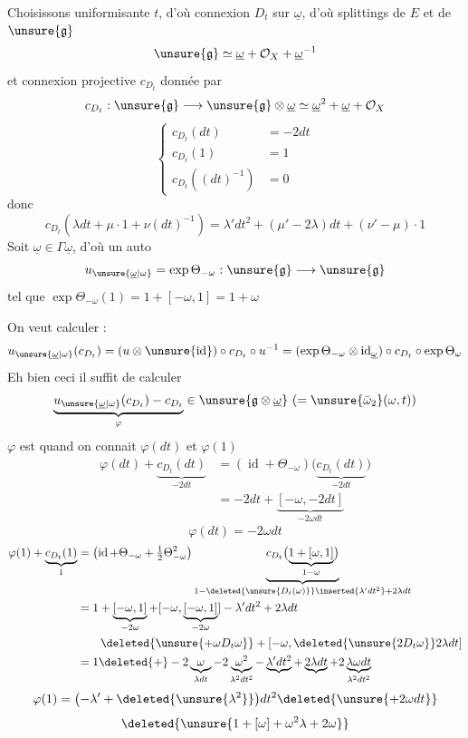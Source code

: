 Choisissons uniformisante $t$, d'où connexion $D_t$ sur $\underline{\omega}$, d'où splittings de $E$ et de $\unsure{\mathfrak g}$
\[
\unsure{\mathfrak g}\simeq\underline{\omega}+\mathcal O_X+\underline{\omega}^{-1}
\]
et connexion projective $c_{D_t}$ donnée par
\[
c_{D_t}:\unsure{\mathfrak g}\longrightarrow\unsure{\mathfrak g}\otimes\underline{\omega}\simeq\underline{\omega}^2+\underline{\omega}+\mathcal O_X
\]
\[
\left\{\begin{aligned}
c_{D_t}(dt)&=-2dt\\
c_{D_t}(1)&=1\\
c_{D_t}((dt)^{-1})&=0
\end{aligned}\right.
\]
donc
\[
c_{D_t}(\lambda dt+\mu\cdot1+\nu(dt)^{-1})=\lambda'dt^2+(\mu'-2\lambda)dt+(\nu'-\mu)\cdot1
\]
Soit $\underline{\omega}\in\Gamma\underline{\omega}$, d'où un auto
\[
u_{\unsure{\underline{\omega}|\omega}}=\exp\Theta_{-\omega}:\unsure{\mathfrak g}\longrightarrow\unsure{\mathfrak g}
\]
tel que $\exp\Theta_{-\omega}(1)=1+[-\omega,1]=1+\omega$

On veut calculer :
\[
u_{\unsure{\underline{\omega}|\omega}}(c_{D_t})=(u\otimes\unsure{\operatorname{id}})\circ c_{D_t}\circ u^{-1}=(\exp\Theta_{-\omega}\otimes\operatorname{id}_{\underline{\omega}})\circ c_{D_t}\circ\exp\Theta_\omega
\]
Eh bien ceci il suffit de calculer
\[
\underbrace{u_{\unsure{\underline{\omega}|\omega}}(c_{D_t})-c_{D_t}}_{\varphi}\in\unsure{\mathfrak g\otimes\underline{\omega}}\ (=\unsure{\bar\omega_2}(\omega,t))
\]
$\varphi$ est  quand on connait $\varphi(dt)$ et $\varphi(1)$
\[
\begin{aligned}
\varphi(dt)+\underbrace{c_{D_t}(dt)}_{-2dt}
&=(\operatorname{id}+\Theta_{-\omega})\bigl(\underbrace{c_{D_t}(dt)}_{-2dt}\bigr)\\
&=-2dt+\underbrace{[-\omega,-2dt]}_{-2\omega dt}
\end{aligned}
\]
\[
\varphi(dt)=-2\omega dt
\]
\margin{\deleted{$\unsure{\varphi}$}}
\[
\begin{aligned}
\varphi(1)+\underbrace{c_{D_t}(1)}_1
&=\left(\operatorname{id}+\Theta_{-\omega}+\tfrac12\Theta_{-\omega}^{2}\right)
\underbrace{c_{D_t}\bigl(\underbrace{1+[\omega,1]}_{1-\omega}\bigr)}_{1-\deleted{\unsure{D_t(\omega)}}\inserted{\lambda'dt^2}+2\lambda dt}\\
&=1+\underbrace{[-\omega,1]}_{-2\omega}+[-\omega,\underbrace{[-\omega,1]}_{-2\omega}]-\lambda'dt^2+2\lambda dt\\
&\qquad\deleted{\unsure{+\omega D_t\omega}}+[-\omega,\deleted{\unsure{2D_t\omega}}2\lambda dt]\\
&=1\deleted{+}-2\underbrace{\omega}_{\lambda dt}-2\underbrace{\omega^2}_{\lambda^2dt^2}-\underbrace{\lambda'dt^2}+\underbrace{2\lambda dt}+2\underbrace{\lambda\omega dt}_{\lambda^2dt^2}
\end{aligned}
\]
\[
\varphi(1)=\bigl(-\lambda'+\deleted{\unsure{\lambda^2}}\bigr)dt^2\deleted{\unsure{+2\omega dt}}
\]
\[
\deleted{\unsure{1+[\omega]+\omega^2\lambda+2\omega}}
\]
